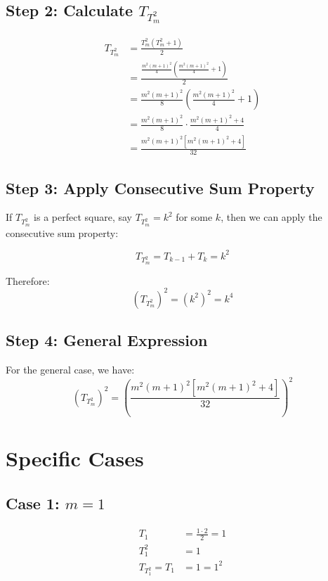 \documentclass{article}
\begin{document}
\subsection{Step 2: Calculate $T_{T_m^2}$}

\begin{align}
T_{T_m^2} &= \frac{T_m^2(T_m^2 + 1)}{2} \\
&= \frac{\frac{m^2(m+1)^2}{4}\left(\frac{m^2(m+1)^2}{4} + 1\right)}{2} \\
&= \frac{m^2(m+1)^2}{8}\left(\frac{m^2(m+1)^2}{4} + 1\right) \\
&= \frac{m^2(m+1)^2}{8} \cdot \frac{m^2(m+1)^2 + 4}{4} \\
&= \frac{m^2(m+1)^2[m^2(m+1)^2 + 4]}{32}
\end{align}

\subsection{Step 3: Apply Consecutive Sum Property}

If $T_{T_m^2}$ is a perfect square, say $T_{T_m^2} = k^2$ for some $k$, then we can apply the consecutive sum property:

\begin{equation}
T_{T_m^2} = T_{k-1} + T_k = k^2
\end{equation}

Therefore:
\begin{equation}
(T_{T_m^2})^2 = (k^2)^2 = k^4
\end{equation}

\subsection{Step 4: General Expression}

For the general case, we have:
\begin{equation}
(T_{T_m^2})^2 = \left(\frac{m^2(m+1)^2[m^2(m+1)^2 + 4]}{32}\right)^2
\end{equation}

\section{Specific Cases}

\subsection{Case 1: $m = 1$}

\begin{align}
T_1 &= \frac{1 \cdot 2}{2} = 1 \\
T_1^2 &= 1 \\
T_{T_1^2} = T_1 &= 1 = 1^2
\end{align}
\end{document}

